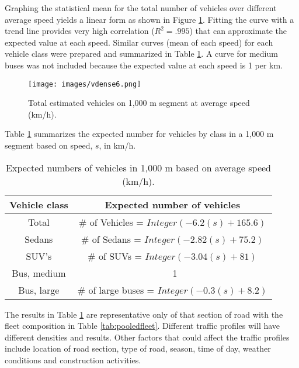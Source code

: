 Graphing the statistical mean for the total number of vehicles over different average speed yields a linear form as shown in Figure \ref{fig9:estimateavemix}.  Fitting the curve with a trend line provides very high correlation ($R^{2} = .995$) that can approximate the expected value at each speed.  Similar curves (mean of each speed) for each vehicle class were prepared and summarized in Table \ref{tb4:expectedvehicles}.  A curve for medium buses was not included because the expected value at each speed is 1 per km.

%
\begin{figure}[H]
\texttt{[image: images/vdense6.png]}
\caption[Total estimated vehicles on 1,000 m segment at average speed]{Total estimated vehicles on 1,000 m segment at average speed (km/h).}
\label{fig9:estimateavemix}
\end{figure}
% 

Table \ref{tb4:expectedvehicles} summarizes the expected number for vehicles by class in a 1,000 m segment based on speed, $s$, in km/h.
%
\begin{table}[H]
\centering
\caption[Expected numbers of vehicles in 1,000 m based on average speed]{Expected numbers of vehicles in 1,000 m based on average speed (km/h).}
\label{tb4:expectedvehicles}
\begin{tabular}{@{}cc@{}}
\toprule
\textbf{Vehicle class} & \textbf{Expected number of vehicles } \\ \midrule
Total & \# of Vehicles = $Integer(-6.2(s) + 165.6)$ \\
Sedans & \# of Sedans = $Integer (-2.82(s) + 75.2)$ \\
SUV's & \# of SUVs = $Integer (-3.04(s) + 81)$ \\
Bus, medium & \ 1 \\
Bus, large & \# of large buses = $Integer (-0.3(s) + 8.2)$ \\ \bottomrule
\end{tabular}
\end{table}
%
The results in Table \ref{tb4:expectedvehicles} are representative only of that section of road with the fleet composition in Table \ref{tab:pooledfleet}.  Different traffic profiles will have different densities and results.  Other factors that could affect the traffic profiles include location of road section, type of road, season, time of day, weather conditions and construction activities. 

